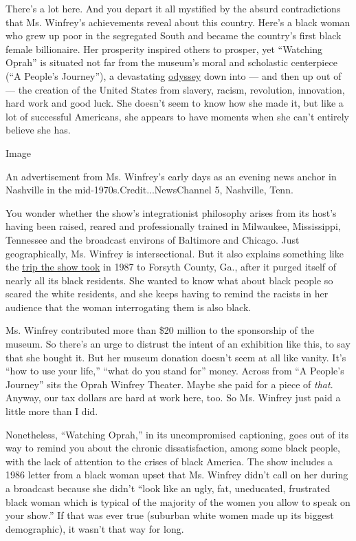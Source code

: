 There's a lot here. And you depart it all mystified by the absurd
contradictions that Ms. Winfrey's achievements reveal about this
country. Here's a black woman who grew up poor in the segregated South
and became the country's first black female billionaire. Her prosperity
inspired others to prosper, yet ``Watching Oprah'' is situated not far
from the museum's moral and scholastic centerpiece (``A People's
Journey''), a devastating
\href{https://www.nytimes3xbfgragh.onion/2016/09/22/arts/design/smithsonian-african-american-museum-review.html}{odyssey}
down into --- and then up out of --- the creation of the United States
from slavery, racism, revolution, innovation, hard work and good luck.
She doesn't seem to know how she made it, but like a lot of successful
Americans, she appears to have moments when she can't entirely believe
she has.

Image

An advertisement from Ms. Winfrey's early days as an evening news anchor
in Nashville in the mid-1970s.Credit...NewsChannel 5, Nashville, Tenn.

You wonder whether the show's integrationist philosophy arises from its
host's having been raised, reared and professionally trained in
Milwaukee, Mississippi, Tennessee and the broadcast environs of
Baltimore and Chicago. Just geographically, Ms. Winfrey is
intersectional. But it also explains something like the
\href{https://www.youtube.com/watch?v=WErjPmFulQ0}{trip the show took}
in 1987 to Forsyth County, Ga., after it purged itself of nearly all its
black residents. She wanted to know what about black people so scared
the white residents, and she keeps having to remind the racists in her
audience that the woman interrogating them is also black.

Ms. Winfrey contributed more than \$20 million to the sponsorship of the
museum. So there's an urge to distrust the intent of an exhibition like
this, to say that she bought it. But her museum donation doesn't seem at
all like vanity. It's ``how to use your life,'' ``what do you stand
for'' money. Across from ``A People's Journey'' sits the Oprah Winfrey
Theater. Maybe she paid for a piece of \emph{that}. Anyway, our tax
dollars are hard at work here, too. So Ms. Winfrey just paid a little
more than I did.

Nonetheless, ``Watching Oprah,'' in its uncompromised captioning, goes
out of its way to remind you about the chronic dissatisfaction, among
some black people, with the lack of attention to the crises of black
America. The show includes a 1986 letter from a black woman upset that
Ms. Winfrey didn't call on her during a broadcast because she didn't
``look like an ugly, fat, uneducated, frustrated black woman which is
typical of the majority of the women you allow to speak on your show.''
If that was ever true (suburban white women made up its biggest
demographic), it wasn't that way for long.

